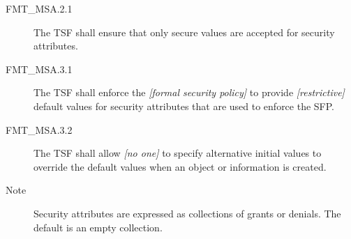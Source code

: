 \documentclass[12pt,english]{scrbook}
\begin{document}

\begin{description}

\item[FMT{\_}MSA.2.1]

    The TSF shall ensure that only secure values are accepted for security
    attributes.

\end{description}




\begin{description}
\item[FMT{\_}MSA.3.1]

The TSF shall enforce the \emph{{[}formal security policy]} to provide 
\emph{{[}restrictive]} default values for security attributes that are used to 
enforce the SFP.

\item[FMT{\_}MSA.3.2 ]

The TSF shall allow \emph{{[}no one]} to specify alternative
initial values to override the default values when an object or
information is created.

\item[Note]

Security attributes are expressed as collections of grants or
denials. The default is an empty collection.

\end{description}





\end{document}
